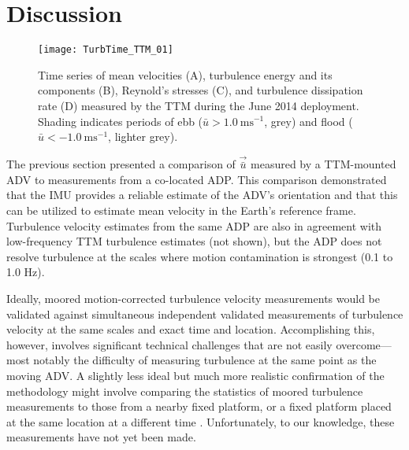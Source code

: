 
\section{Discussion}
\label{sec:discussion}

\begin{figure*}[t]
  \centering
  \texttt{[image: TurbTime\_TTM\_01]}
  \caption{Time series of mean velocities (A), turbulence energy and its components (B), Reynold's stresses (C), and turbulence dissipation rate (D) measured by the TTM during the June 2014 deployment. Shading indicates periods of ebb ($\bar{u}>1.0\ \mathrm{ms^{-1}}$, grey) and flood ($\bar{u}<-1.0\ \mathrm{ms^{-1}}$, lighter grey).}
  \label{fig:turbtime:ttm}
\end{figure*}

The previous section presented a comparison of $\vec{\bar{u}}$ measured by a TTM-mounted ADV to measurements from a co-located ADP. This comparison demonstrated that the IMU provides a reliable estimate of the ADV's orientation and that this can be utilized to estimate mean velocity in the Earth's reference frame. Turbulence velocity estimates from the same ADP are also in agreement with low-frequency TTM turbulence estimates (not shown), but the ADP does not resolve turbulence at the scales where motion contamination is strongest (0.1 to 1.0 Hz).

Ideally, moored motion-corrected turbulence velocity measurements would be validated against simultaneous independent validated measurements of turbulence velocity at the same scales and exact time and location. Accomplishing this, however, involves significant technical challenges that are not easily overcome---most notably the difficulty of measuring turbulence at the same point as the moving ADV. A slightly less ideal but much more realistic confirmation of the methodology might involve comparing the statistics of moored turbulence measurements to those from a nearby fixed platform, or a fixed platform placed at the same location at a different time \cite[e.g., the ``TTT" platform described in][]{Thomson++2012}. Unfortunately, to our knowledge, these measurements have not yet been made.

